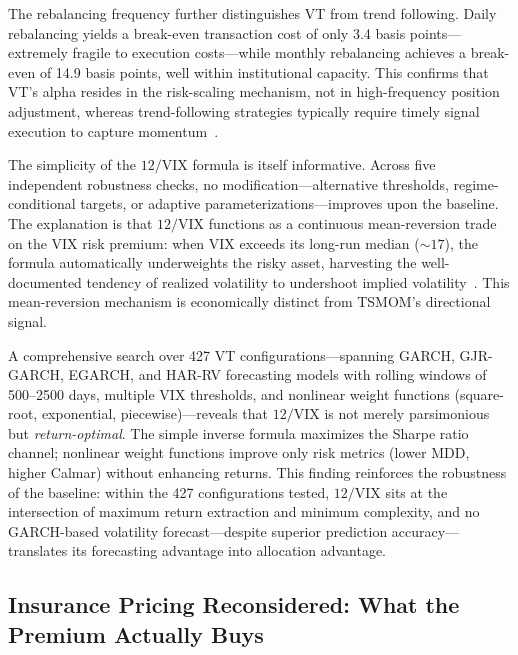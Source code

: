 The rebalancing frequency further distinguishes VT from trend following. Daily rebalancing yields a break-even transaction cost of only 3.4 basis points---extremely fragile to execution costs---while monthly rebalancing achieves a break-even of 14.9 basis points, well within institutional capacity. This confirms that VT's alpha resides in the risk-scaling mechanism, not in high-frequency position adjustment, whereas trend-following strategies typically require timely signal execution to capture momentum~\citep{moskowitz2012}.

The simplicity of the $12/\text{VIX}$ formula is itself informative. Across five independent robustness checks, no modification---alternative thresholds, regime-conditional targets, or adaptive parameterizations---improves upon the baseline. The explanation is that $12/\text{VIX}$ functions as a continuous mean-reversion trade on the VIX risk premium: when VIX exceeds its long-run median (${\sim}17$), the formula automatically underweights the risky asset, harvesting the well-documented tendency of realized volatility to undershoot implied volatility~\citep{bozovic2024}. This mean-reversion mechanism is economically distinct from TSMOM's directional signal.

A comprehensive search over 427 VT configurations---spanning GARCH, GJR-GARCH, EGARCH, and HAR-RV forecasting models with rolling windows of 500--2500 days, multiple VIX thresholds, and nonlinear weight functions (square-root, exponential, piecewise)---reveals that $12/\text{VIX}$ is not merely parsimonious but \textit{return-optimal}. The simple inverse formula maximizes the Sharpe ratio channel; nonlinear weight functions improve only risk metrics (lower MDD, higher Calmar) without enhancing returns. This finding reinforces the robustness of the baseline: within the 427 configurations tested, $12/\text{VIX}$ sits at the intersection of maximum return extraction and minimum complexity, and no GARCH-based volatility forecast---despite superior prediction accuracy---translates its forecasting advantage into allocation advantage.

\subsection{Insurance Pricing Reconsidered: What the Premium Actually Buys}

